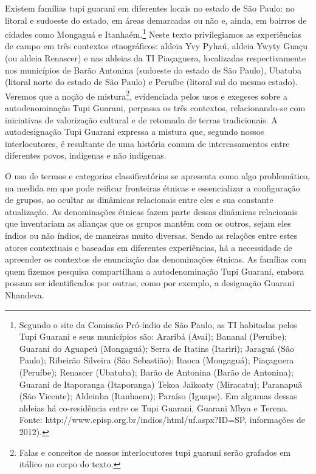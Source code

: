 Existem famílias tupi guarani em diferentes locais no estado de São
Paulo: no litoral e sudoeste do estado, em áreas demarcadas ou não e,
ainda, em bairros de cidades como Mongaguá e Itanhaém.\footnote{Segundo
o site da Comissão Pró-índio de São Paulo, as TI habitadas pelos Tupi
Guarani e seus municípios são: Araribá (Avaí); Bananal (Peruíbe);
Guarani do Aguapeú (Mongaguá); Serra de Itatins (Itariri); Jaraguá (São
Paulo); Ribeirão Silveira (São Sebastião); Itaoca (Mongaguá);
Piaçaguera (Peruíbe); Renascer (Ubatuba); Barão de Antonina (Barão de
Antonina); Guarani de Itaporanga (Itaporanga) Tekoa Jaikoaty
(Miracatu); Paranapuã (São Vicente); Aldeinha (Itanhaem); Paraíso
(Iguape). Em algumas dessas aldeias há co-residência entre os Tupi
Guarani, Guarani Mbya e Terena. Fonte: http://www.cpisp.org.br/indios/html/uf.aspx?ID=SP, informações de
2012).} Neste texto privilegiamos as experiências de campo em três
contextos etnográficos: aldeia Yvy Pyhaú, aldeia Ywyty Guaçu (ou aldeia
Renascer) e nas aldeias da TI Piaçaguera, localizadas respectivamente
nos municípios de Barão Antonina (sudoeste do estado de São Paulo),
Ubatuba (litoral norte do estado de São Paulo) e Peruíbe (litoral sul
do mesmo estado). Veremos que a noção de mistura\footnote{Falas e
conceitos de nossos interlocutores tupi guarani serão grafados em
itálico no corpo do texto.}, evidenciada pelos usos e exegeses sobre a
autodenominação Tupi Guarani, perpassa os três contextos,
relacionando-se com iniciativas de valorização cultural e de retomada
de terras tradicionais. A autodesignação Tupi Guarani expressa a
mistura que, segundo nossos interlocutores, é resultante de uma história
comum de intercasamentos entre diferentes povos, indígenas e não
indígenas. 

O uso de termos e categorias classificatórias se apresenta como algo
problemático, na medida em que pode reificar fronteiras étnicas e
essencializar a configuração de grupos, ao ocultar as dinâmicas
relacionais entre eles e sua constante atualização. As denominações
étnicas fazem parte dessas dinâmicas relacionais que inventariam as
alianças que os grupos mantêm com os outros, sejam eles índios ou não
índios, de maneiras muito diversas. Sendo as relações entre estes
atores contextuais e baseadas em diferentes experiências, há a
necessidade de apreender os contextos de enunciação das denominações
étnicas. As famílias com quem fizemos pesquisa compartilham a
autodenominação Tupi Guarani, embora possam ser identificados por
outras, como por exemplo, a designação Guarani Nhandeva.

